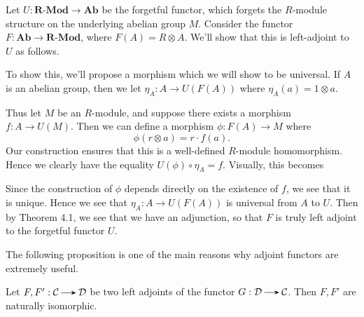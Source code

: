     \begin{example}
    Let $U: \textbf{R-Mod} \to \textbf{Ab}$ be the forgetful functor,
    which forgets the $R$-module structure on the underlying abelian
    group $M$. Consider the functor $F: \textbf{Ab} \to
    \textbf{R-Mod}$, where $F(A) = R \otimes A$. We'll show that this
    is left-adjoint to $U$ as follows. 

    To show this, we'll propose a morphism which we will show to be
    universal. If $A$ is an abelian group, then we let 
    $\eta_A : A \to U(F(A))$ where $\eta_A(a) = 1 \otimes a$. 

    Thus let $M$ be an $R$-module, and suppose there exists a morphism
    $f: A \to U(M)$. Then we can define a morphism $\phi: F(A) \to M$
    where 
    \[
        \phi(r \otimes a) = r\cdot f(a).
    \]
    Our construction ensures that this is a well-defined $R$-module
    homomorphism. Hence we clearly have the equality $U(\phi) \circ \eta_A =
    f$. Visually, this becomes 
    \begin{center}
        \hspace{1cm}
    \end{center} 
    Since the construction of $\phi$ depends directly on the existence
    of $f$, we see that it is unique. Hence we see that $\eta_A: A \to
    U(F(A))$ is universal from $A$ to $U$. Then by Theorem 4.1, we see
    that we have an adjunction, so that $F$ is truly left adjoint to
    the forgetful functor $U$. 
    
    \end{example}

    The following proposition is one of the main reasons why adjoint functors are 
    extremely useful.

    \begin{proposition}
        Let $F, F' : \cc \to \dd$ be two left adjoints of the functor
        $G : \dd \to \cc$. Then $F, F'$ are naturally isomorphic. 
    \end{proposition}

